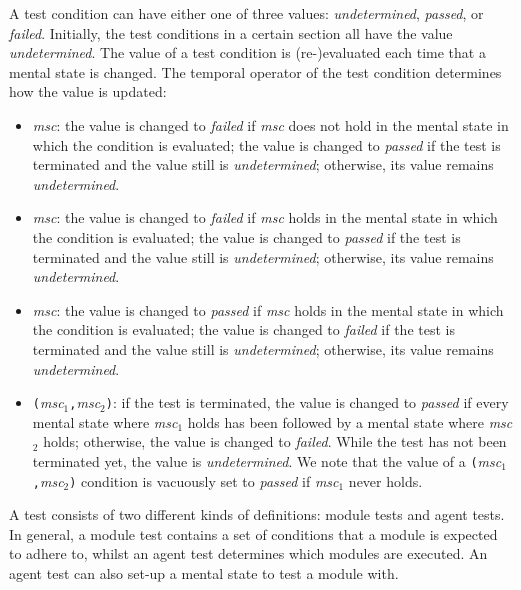 \documentclass{article}
\begin{document}
A test condition can have either one of three values: \textit{undetermined}, \textit{passed}, or \textit{failed}. Initially, the test conditions in a certain section all have the value \textit{undetermined}. The value of a test condition is (re-)evaluated each time that a mental state is changed. The temporal operator of the test condition determines how the value is updated:
\begin{itemize}
 \item \always \textit{msc}: the value is changed to \textit{failed} if \textit{msc} does not hold in the mental state in which the condition is evaluated; the value is changed to \textit{passed} if the test is terminated and the value still is \textit{undetermined}; otherwise, its value remains \textit{undetermined}.
 \item \never \textit{msc}: the value is changed to \textit{failed} if \textit{msc} holds in the mental state in which the condition is evaluated; the value is changed to \textit{passed} if the test is terminated and the value still is \textit{undetermined}; otherwise, its value remains \textit{undetermined}.
 \item \eventually \textit{msc}: the value is changed to \textit{passed} if \textit{msc} holds in the mental state in which the condition is evaluated; the value is changed to \textit{failed} if the test is terminated and the value still is \textit{undetermined}; otherwise, its value remains \textit{undetermined}.
 \item \reactto\texttt{(}\textit{msc$_1$}\texttt{,}\textit{msc$_2$}\texttt{)}: if the test is terminated, the value is changed to \textit{passed} if every mental state where \textit{msc$_1$} holds has been followed by a mental state where \textit{msc$_2$} holds; otherwise, the value is changed to \textit{failed}. While the test has not been terminated yet, the value is \textit{undetermined}. We note that the value of a \reactto\texttt{(}\textit{msc$_1$}\texttt{,}\textit{msc$_2$}\texttt{)} condition is vacuously set to \textit{passed} if \textit{msc$_1$} never holds.
\end{itemize}

A test consists of two different kinds of definitions: module tests and agent tests. In general, a module test contains a set of conditions that a module is expected to adhere to, whilst an agent test determines which modules are executed. An agent test can also set-up a mental state to test a module with.
\end{document}
